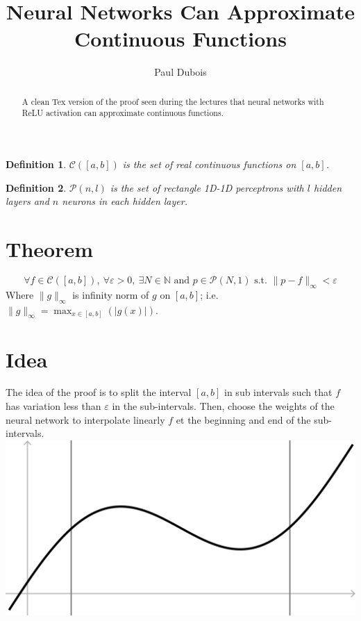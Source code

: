 \documentclass[]{article}
\title{Neural Networks Can Approximate Continuous Functions}
\author{Paul Dubois}
\date{}
\newtheorem{definition}{Definition}
\begin{document}
\maketitle

\begin{abstract}
	A clean Tex version of the proof seen during the lectures that neural networks with ReLU activation can approximate continuous functions.
\end{abstract}

\begin{definition}
	$\mathcal{C}\left( \left[ a,b \right] \right)$ is the set of real continuous functions on $\left[ a,b \right]$.
\end{definition}
\begin{definition}
	$\mathcal{P}\left( n,l \right)$ is the set of rectangle 1D-1D perceptrons with $l$ hidden layers and $n$ neurons in each hidden layer.
\end{definition}

\section{Theorem}
$$\forall f \in \mathcal{C}(\left[ a,b \right]), \ \forall \varepsilon > 0, \ \exists N \in \mathbb{N} \text{ and } p \in \mathcal{P}(N,1) \text{ s.t. } \|p-f\|_\infty < \varepsilon$$
Where $\|g\|_\infty$ is infinity norm of $g$ on $\left[ a,b \right]$; i.e. $\|g\|_\infty = \max_{x \in \left[ a,b \right]}(|g(x)|)$.

\section{Idea}
The idea of the proof is to split the interval $\left[ a,b \right]$ in sub intervals such that $f$ has variation less than $\varepsilon$ in the sub-intervals.
Then, choose the weights of the neural network to interpolate linearly $f$ et the beginning and end of the sub-intervals.
\includegraphics[width=\linewidth]{plot}
\end{document}
